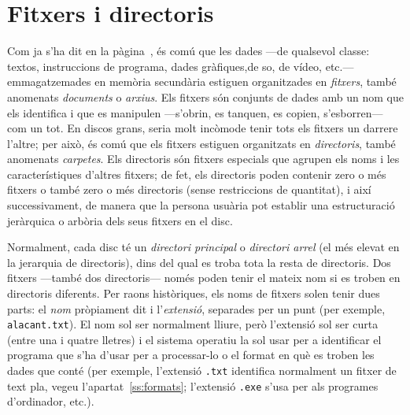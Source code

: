 


\section{Fitxers i directoris}
\label{se:fitxers}
\label{pg:fitxer}

Com ja s'ha dit en la pàgina~\pageref{pg:menciofitxer}, és comú que
les dades ---de qualsevol classe: textos, instruccions de programa,
dades gràfiques,de so, de vídeo, etc.--- emmagatzemades en memòria
secundària estiguen organitzades en {\em fitxers}, també anomenats
\emph{documents} o \emph{arxius}. Els fitxers són conjunts de dades
amb un nom que els identifica i que es manipulen ---s'obrin, es
tanquen, es copien, s'esborren--- com un tot. En discos grans, seria
molt incòmode tenir tots els fitxers un darrere l'altre; per això, és
comú que els fitxers estiguen organitzats en {\em directoris}, també
anomenats \emph{carpetes}. Els directoris són fitxers especials que
agrupen els noms i les característiques d'altres fitxers; de fet, els
directoris poden contenir zero o més fitxers o també zero o més
directoris (sense restriccions de quantitat), i així successivament,
de manera que la persona usuària pot establir una estructuració
jeràrquica o arbòria dels seus fitxers en el disc.

Normalment, cada disc té un {\em directori principal} o
\emph{directori arrel} (el més elevat en la jerarquia de directoris),
dins del qual es troba tota la resta de directoris. Dos fitxers
---també dos directoris--- només poden tenir el mateix nom si es
troben en directoris diferents. Per raons històriques, els noms de
fitxers solen tenir dues parts: el \emph{nom} pròpiament dit i
l'\emph{extensió}, separades per un punt (per exemple,
\texttt{alacant.txt}). El nom sol ser normalment lliure, però
l'extensió sol ser curta (entre una i quatre lletres) i el sistema
operatiu la sol usar per a identificar el programa que s'ha d'usar per
a processar-lo o el format en què es troben les dades que conté (per
exemple, l'extensió \texttt{.txt} identifica normalment un fitxer de
text pla, vegeu l'apartat~\ref{ss:formats}; l'extensió \texttt{.exe}
s'usa per als programes d'ordinador, etc.).


